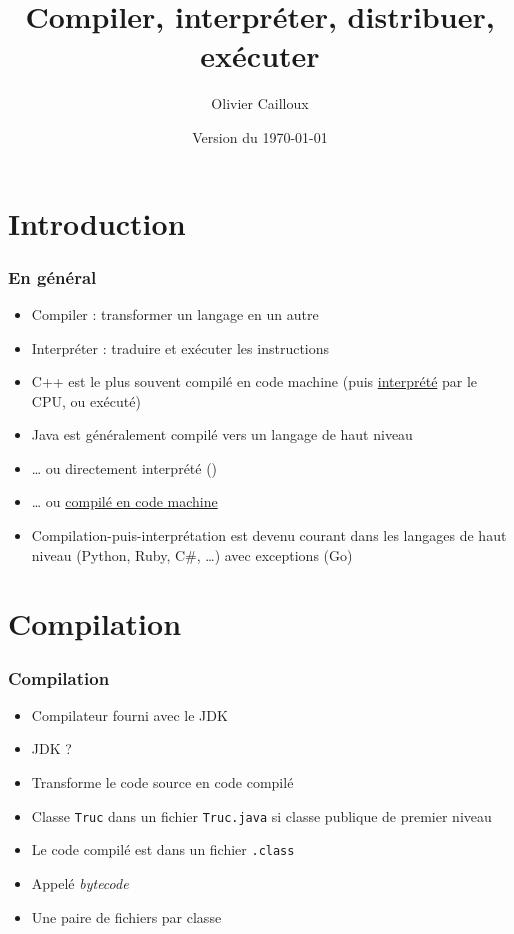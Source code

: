 \documentclass[english, french]{beamer}
\title{Compiler, interpréter, distribuer, exécuter}
\author{Olivier Cailloux}
\institute[LAMSADE]{LAMSADE, Université Paris-Dauphine}
\date{Version du \today}
\begin{document}
\begin{frame}[plain]
	\titlepage
\end{frame}
\addtocounter{framenumber}{-1}

\section{Introduction}
\begin{frame}
	\frametitle{En général}
	\begin{itemize}
		\item Compiler : transformer un langage en un autre
		\item Interpréter : traduire et exécuter les instructions
		\item C++ est le plus souvent compilé en code machine (puis \href{https://stackoverflow.com/a/9547498/}{interprété} par le CPU, ou \og{}exécuté\fg{})
		\item Java est généralement compilé vers un langage de haut niveau
		\item … ou directement interprété (\only<2->{jshell})
		\item … ou \href{https://www.graalvm.org/latest/reference-manual/native-image/}{compilé en code machine}
		\item Compilation-puis-interprétation est devenu courant dans les langages de haut niveau (Python, Ruby, C\#, …) avec exceptions (Go)
	\end{itemize}
\end{frame}

\section{Compilation}
\begin{frame}
	\frametitle{Compilation}
	\begin{itemize}
		\item Compilateur fourni avec le JDK
		\item JDK ? \uncover<2>{Java Development Kit}
		\item Transforme le code source en code compilé
		\item Classe \texttt{Truc} dans un fichier \texttt{Truc.java} {\tiny {} si classe publique de premier niveau}
		\item Le code compilé est dans un fichier \texttt{.class}
		\item Appelé \emph{bytecode}
		\item Une paire de fichiers par classe
	\end{itemize}
\end{frame}
\end{document}
